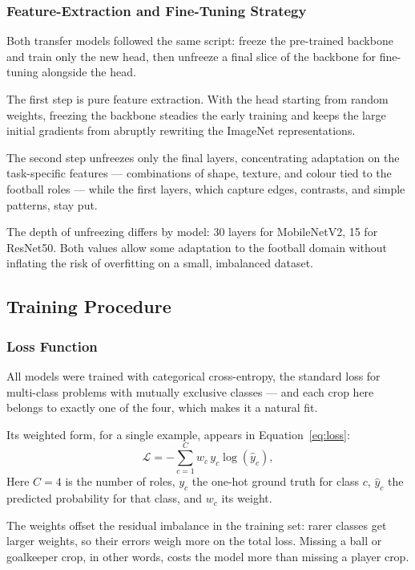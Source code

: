 \documentclass[preprint,12pt]{elsarticle}
\begin{document}
\subsubsection{Feature-Extraction and Fine-Tuning Strategy}

Both transfer models followed the same script: freeze the pre-trained backbone and train only the new head, then unfreeze a final slice of the backbone for fine-tuning alongside the head.

The first step is pure feature extraction. With the head starting from random weights, freezing the backbone steadies the early training and keeps the large initial gradients from abruptly rewriting the ImageNet representations.

The second step unfreezes only the final layers, concentrating adaptation on the task-specific features --- combinations of shape, texture, and colour tied to the football roles --- while the first layers, which capture edges, contrasts, and simple patterns, stay put.

The depth of unfreezing differs by model: 30 layers for MobileNetV2, 15 for ResNet50. Both values allow some adaptation to the football domain without inflating the risk of overfitting on a small, imbalanced dataset.

\subsection{Training Procedure}

\subsubsection{Loss Function}

All models were trained with categorical cross-entropy, the standard loss for multi-class problems with mutually exclusive classes --- and each crop here belongs to exactly one of the four, which makes it a natural fit.

Its weighted form, for a single example, appears in Equation~\eqref{eq:loss}:
\begin{equation}
\mathcal{L} = -\sum_{c=1}^{C} w_c\, y_c \log(\hat{y}_c),
\label{eq:loss}
\end{equation}
Here $C=4$ is the number of roles, $y_c$ the one-hot ground truth for class $c$, $\hat{y}_c$ the predicted probability for that class, and $w_c$ its weight.

The weights offset the residual imbalance in the training set: rarer classes get larger weights, so their errors weigh more on the total loss. Missing a ball or goalkeeper crop, in other words, costs the model more than missing a player crop.
\end{document}
